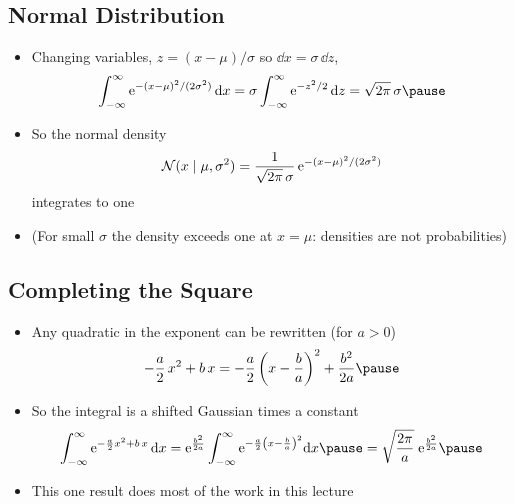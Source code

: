 \begin{slide}
\section[-2]{Normal Distribution}

\begin{PauseHighLight}
  \begin{itemize}
  \item Changing variables, $z = (x-\mu)/\sigma$ so $\dd x = \sigma\,\dd z$,
    \begin{align*}
      \int_{-\infty}^{\infty} \e{-(x-\mu)^2/(2\sigma^2)}\,\dd x =
      \sigma \int_{-\infty}^{\infty} \e{-z^2/2}\,\dd z =
      \sqrt{2\pi}\,\sigma\pause
    \end{align*}
  \item So the normal density
    \begin{align*}
      \mathcal{N}(x\mid\mu,\sigma^2) = \frac{1}{\sqrt{2\pi}\,\sigma}\,
      {\rm e}^{-(x-\mu)^2/(2\sigma^2)}
    \end{align*}
    integrates to one\pause
  \item (For small $\sigma$ the density exceeds one at $x=\mu$:
    densities are not probabilities)\pause
  \end{itemize}
\end{PauseHighLight}

\end{slide}


\begin{slide}
\section[-2]{Completing the Square}

\begin{PauseHighLight}
  \begin{itemize}
  \item Any quadratic in the exponent can be rewritten (for $a>0$)
    \begin{align*}
      -\frac{a}{2}\,x^2 + b\,x = -\frac{a}{2}\left(x - \frac{b}{a}\right)^2
      + \frac{b^2}{2a}\pause
    \end{align*}
  \item So the integral is a shifted Gaussian times a constant
    \begin{align*}
      \int_{-\infty}^{\infty} \e{-\frac{a}{2}x^2 + b\,x}\,\dd x
      = \e{\frac{b^2}{2a}} \int_{-\infty}^{\infty}
      \e{-\frac{a}{2}\left(x - \frac{b}{a}\right)^2}\dd x
      \pause = \sqrt{\frac{2\pi}{a}}\;\e{\frac{b^2}{2a}}\pause
    \end{align*}
  \item This one result does most of the work in this lecture\pause
  \end{itemize}
\end{PauseHighLight}

\end{slide}

